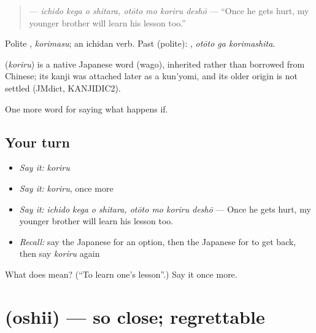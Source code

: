 \begin{quote}
\textbf{   } — \emph{ichido kega o shitara, otōto mo koriru deshō} — \textquotedblleft{}Once he gets hurt, my younger brother will learn his lesson too.\textquotedblright{}
\end{quote}

Polite \textbf{}, \emph{korimasu}; an ichidan verb. Past (polite): \textbf{ }, \emph{otōto ga korimashita}.

\begin{cousinweb}
\textbf{} (\emph{koriru}) is a native Japanese word (wago), inherited rather than borrowed from Chinese; its kanji was attached later as a kun'yomi, and its older origin is not settled (JMdict, KANJIDIC2).
\end{cousinweb}

\begin{grammarlens}[title={What you've built}]
One more word for saying what happens if.
\end{grammarlens}

\subsection*{Your turn}
\begin{itemize}
\raggedright
  \item \emph{Say it:} \emph{koriru}
  \item \emph{Say it:} \emph{koriru}, once more
  \item \emph{Say it:} \emph{ichido kega o shitara, otōto mo koriru deshō} — Once he gets hurt, my younger brother will learn his lesson too.
  \item \emph{Recall:} say the Japanese for an option, then the Japanese for to get back, then say \emph{koriru} again
\end{itemize}

\begin{tcolorbox}[breakable,colback=teal!4,colframe=teal!35!black,title={Before you move on}]
What does  mean? (\textquotedblleft{}To learn one's lesson\textquotedblright{}.) Say it once more.
\end{tcolorbox}
\section[\texorpdfstring{\ja{おしい} (oshii)}{おしい (oshii)}]{ (oshii) — so close; regrettable}

